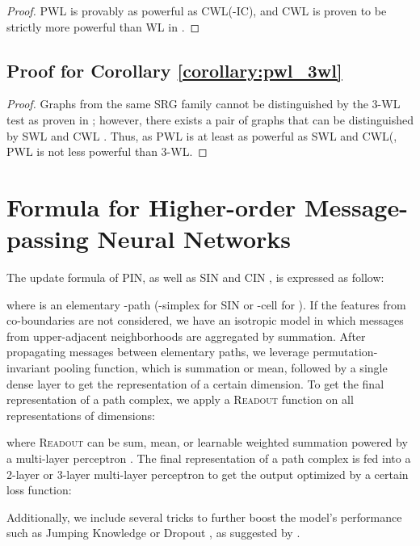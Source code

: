 \documentclass[letterpaper]{article} \usepackage{aaai24}  \usepackage{times}  \usepackage{helvet}  \usepackage{courier}  \usepackage[hyphens]{url}  \usepackage{graphicx} \urlstyle{rm} \def\UrlFont{\rm}  \usepackage{natbib}  \usepackage{caption} \frenchspacing  \setlength{\pdfpagewidth}{8.5in} \setlength{\pdfpageheight}{11in} \usepackage{algorithm}
\begin{document}
\begin{proof}
    PWL is provably as powerful as CWL(-IC), and CWL is proven to be strictly more powerful than WL in \cite{bodnar_weisfeiler_2022}.
\end{proof}


\subsection{Proof for Corollary \ref{corollary:pwl_3wl}}

\begin{proof}
    Graphs from the same SRG family cannot be distinguished by the 3-WL test as proven in \cite{bodnar_weisfeiler_2021}; however, there exists a pair of graphs that can be distinguished by SWL and CWL \cite{bodnar_weisfeiler_2021, bodnar_weisfeiler_2022}. Thus, as PWL is at least as powerful as SWL and CWL(, PWL is not less powerful than 3-WL.
\end{proof}

\section{Formula for Higher-order Message-passing Neural Networks} \label{app:formula-mp}

The update formula of PIN, as well as SIN \cite{bodnar_weisfeiler_2021} and CIN \cite{bodnar_weisfeiler_2022}, is expressed as follow:



where  is an elementary -path (-simplex for SIN \cite{bodnar_weisfeiler_2021} or -cell for \cite{bodnar_weisfeiler_2022}). If the features from co-boundaries are not considered, we have an isotropic model in which messages from upper-adjacent neighborhoods are aggregated by summation. After propagating messages between elementary paths, we leverage permutation-invariant pooling function, which is summation or mean, followed by a single dense layer to get the representation of a certain dimension. To get the final representation of a path complex, we apply a \textsc{Readout} function on all representations of dimensions:

where \textsc{Readout} can be sum, mean, or learnable weighted summation powered by a multi-layer perceptron \cite{giusti_cin_2023}. The final representation of a path complex is fed into a 2-layer or 3-layer multi-layer perceptron to get the output optimized by a certain loss function: 

Additionally, we include several tricks to further boost the model's performance such as Jumping Knowledge\cite{xu_representation_2018} or Dropout \cite{srivastava_dropout_2014}, as suggested by \cite{bodnar_weisfeiler_2021, bodnar_weisfeiler_2022}.
\end{document}
